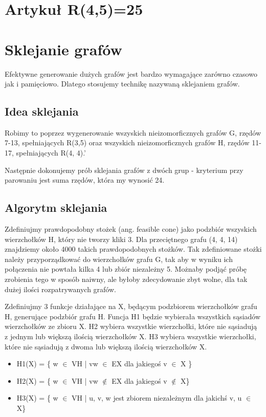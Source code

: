 \documentclass[11pt]{article}
\begin{document}
\section{Artykuł R(4,5)=25}

\section{Sklejanie grafów}
Efektywne generowanie dużych grafów jest bardzo wymagające zarówno czasowo jak i pamięciowo. Dlatego stosujemy technikę nazywaną sklejaniem grafów. 

\subsection{Idea sklejania}
Robimy to poprzez wygenerowanie wszyskich nieizomorficznych grafów G, rzędów 7-13, spełniających R(3,5) oraz wszyskich
nieizomorficznych grafów H, rzędów 11-17, spełniających R(4, 4).'

Następnie dokonujemy prób sklejania grafów z dwóch grup - kryterium przy parowaniu jest suma rzędów, która my wynosić 24. 

\subsection{Algorytm sklejania}
Zdefiniujmy prawdopodobny stożek (ang. feasible cone) jako podzbiór wszyskich wierzchołków H, który nie tworzy kliki 3.
Dla przeciętnego grafu (4, 4, 14) znajdziemy około 4000 takich prawdopodobnych stożków. 
Tak zdefiniowane stożki należy przyporządkować do wierzchołków  grafu G, tak aby w wyniku ich połączenia nie powtała kilka 4 lub zbiór niezależny 5.
Możnaby podjąć próbę zrobienia tego w sposób naiwny, ale byłoby zdecydowanie zbyt wolne, dla tak dużej ilości rozpatrywanych grafów.

Zdefiniujmy 3 funkcje działające na X, będącym podzbiorem wierzchołków grafu H, generujące podzbiór grafu H. 
Funcja H1 będzie wybierała wszystkich sąsiadów wierzchołków ze zbioru X.
H2 wybiera wszystkie wierzchołki, które nie sąsiadują z jednym lub większą ilością wierzchołków X. 
H3 wybiera wszystkie wierzchołki, które nie sąsiadują z dwoma lub większą ilością wierzchołków X.
\begin{itemize}
    
  \item   H1(X) = \{ w $\in$ VH | vw $\in$ EX dla jakiegoś v $\in$ X \} 
  
  \item   H2(X) = \{ w $\in$ VH | vw $\notin$ EX dla jakiegoś v $\notin$ X\}
  
  \item   H3(X) = \{ w $\in$ VH | { u, v, w } jest zbiorem niezależnym dla jakichś v, u $\in$ X\} 
  
\end{itemize}
\end{document}
